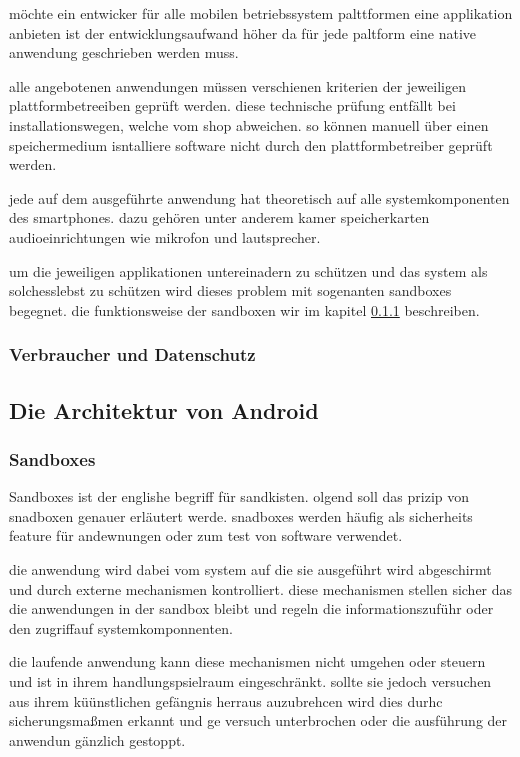 möchte ein entwicker für alle mobilen betriebssystem palttformen eine applikation anbieten ist der entwicklungsaufwand höher da für jede paltform eine native anwendung geschrieben werden muss.

alle angebotenen anwendungen müssen verschienen kriterien der jeweiligen plattformbetreeiben geprüft werden. diese technische prüfung entfällt bei installationswegen, welche vom shop abweichen. so können manuell über einen speichermedium isntalliere software nicht durch den plattformbetreiber geprüft werden.

jede auf dem ausgeführte anwendung hat theoretisch auf alle systemkomponenten des smartphones. dazu gehören unter anderem kamer speicherkarten audioeinrichtungen wie mikrofon und lautsprecher.

um die jeweiligen applikationen untereinadern zu schützen und das system als solchesslebst zu schützen wird dieses problem mit sogenanten sandboxes begegnet. die funktionsweise der sandboxen wir im kapitel \ref{sandbox} beschreiben.
\subsubsection{Verbraucher und Datenschutz}


\subsection{Die Architektur von Android}
\subsubsection{Sandboxes}
\label{sandbox}
Sandboxes ist der englishe begriff für sandkisten. olgend soll das prizip von snadboxen genauer erläutert werde. snadboxes werden häufig als sicherheits feature für andewnungen oder zum test von software verwendet.

die anwendung wird dabei vom  system auf die sie ausgeführt wird abgeschirmt und durch externe mechanismen kontrolliert. diese mechanismen stellen sicher das die anwendungen in der sandbox bleibt und regeln die informationszuführ oder den zugriffauf systemkomponnenten.

die laufende anwendung kann diese mechanismen nicht umgehen oder steuern und ist in ihrem handlungspsielraum eingeschränkt. sollte sie jedoch versuchen aus ihrem küünstlichen gefängnis herraus auzubrehcen wird dies durhc sicherungsmaßmen erkannt und ge versuch unterbrochen oder die ausführung der anwendun gänzlich gestoppt.

